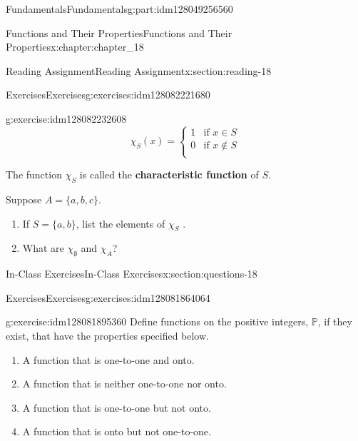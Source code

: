\documentclass[oneside,10pt,]{book}
\newcommand{\terminology}[1]{\textbf{#1}}
\numberwithin{equation}{section}
\begin{document}
\begin{partptx}{Fundamentals}{}{Fundamentals}{}{}{g:part:idm128049256560}
\begin{chapterptx}{Functions and Their Properties}{}{Functions and Their Properties}{}{}{x:chapter:chapter_18}
\begin{sectionptx}{Reading Assignment}{}{Reading Assignment}{}{}{x:section:reading-18}
\begin{exercises-subsection}{Exercises}{}{Exercises}{}{}{g:exercises:idm128082221680}
\begin{exercisegroup}
\begin{divisionexerciseeg}{2}{}{}{g:exercise:idm128082232608}
\begin{equation*}
\chi_S(x)= \left\{
\begin{array}{cc}
1 & \textrm{if } x\in S \\
0 & \textrm{if } x\notin S \\
\end{array}
\right.
\end{equation*}
%
\par
The function \(\chi_S\) is called the \terminology{characteristic function} of \(S\).%
\par
Suppose \(A = \{a, b, c\}\).%
\begin{enumerate}[label=(\alph*)]
\item{}If  \(S = \{a, b\}\), list the elements of \(\chi_S\) .%
\item{}What are \(\chi_{\emptyset}\) and \(\chi_A\)?%
\end{enumerate}
%
\end{divisionexerciseeg}%
\end{exercisegroup}
\par\medskip\noindent
\end{exercises-subsection}
\end{sectionptx}
%
%
\typeout{************************************************}
\typeout{************************************************}
%
\begin{sectionptx}{In-Class Exercises}{}{In-Class Exercises}{}{}{x:section:questions-18}
%
%
%
\typeout{************************************************}
\typeout{************************************************}
%
\begin{exercises-subsection}{Exercises}{}{Exercises}{}{}{g:exercises:idm128081864064}
\par\medskip\noindent%
%
\begin{exercisegroup}
\begin{divisionexerciseeg}{1}{}{}{g:exercise:idm128081895360}%
Define functions on the positive integers, \(\mathbb{P}\), if they exist, that have the properties specified below.%
\begin{enumerate}[label=(\alph*)]
\item{}A function that is one-to-one and onto.%
\item{}A function that is neither one-to-one nor onto.%
\item{}A function that is one-to-one but not onto.%
\item{}A function that is onto but not one-to-one.%
\end{enumerate}

\end{divisionexerciseeg}
\end{exercisegroup}
\end{exercises-subsection}
\end{sectionptx}
\end{chapterptx}
\end{partptx}
\end{document}
